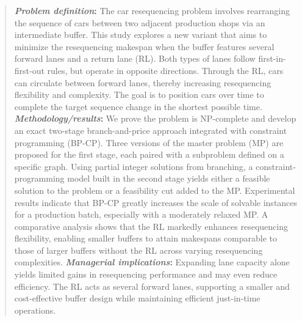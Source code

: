 \documentclass[12pt]{article}
\begin{document}

\maketitle

\begingroup
\renewcommand\thefootnote{}
\endgroup
\setcounter{footnote}{0}

\begin{abstract}
\textbf{\textit{Problem definition}:} The car resequencing problem involves rearranging the sequence of cars between two adjacent production shops via an intermediate buffer. %
This study explores a new variant that aims to minimize the resequencing makespan when the buffer features several forward lanes and a return lane (RL). Both types of lanes follow first-in-first-out rules, but operate in opposite directions. %
Through the RL, cars can circulate between forward lanes, thereby increasing resequencing flexibility and complexity. %
The goal is to position cars over time to complete the target sequence change in the shortest possible time. \textbf{\textit{Methodology/results}:} We prove the problem is NP-complete and develop an exact two-stage branch-and-price approach integrated with constraint programming (BP-CP). Three versions of the master problem (MP) are proposed for the first stage, each paired with a subproblem defined on a specific graph. Using partial integer solutions from branching, a constraint-programming model built in the second stage yields either a feasible solution to the problem or a feasibility cut added to the MP. Experimental results indicate that BP-CP greatly increases the scale of solvable instances for a production batch, especially with a moderately relaxed MP. A comparative analysis shows that the RL markedly enhances resequencing flexibility, enabling smaller buffers to attain makespans comparable to those of larger buffers without the RL across varying resequencing complexities. \textbf{\textit{Managerial implications}:} Expanding lane capacity alone yields limited gains in resequencing performance and may even reduce efficiency. The RL acts
as several forward lanes, supporting a smaller and cost-effective buffer design while maintaining efficient just-in-time operations.
\end{abstract}
\end{document}
